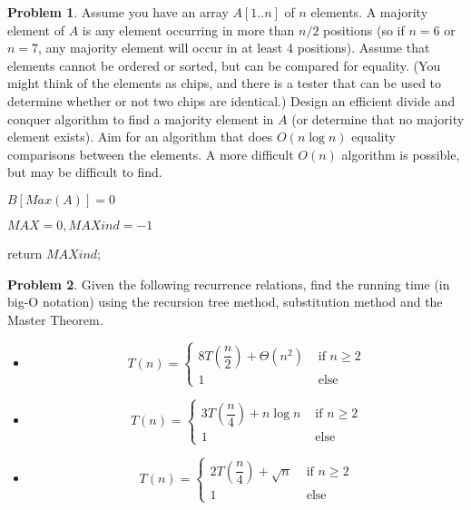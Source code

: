 \documentclass{article}
\theoremstyle{definition}
\newtheorem{Q}{Problem}
\begin{document}
\pagebreak
\begin{Q}
Assume you have an array $A[1..n]$ of $n$ elements. A majority element of $A$ is any element occurring in more than $n/2$ positions (so if $n = 6$ or $n = 7$, any majority element will occur in at least $4$ positions). Assume that elements cannot be ordered or sorted, but can be compared for equality. (You might think of the elements as chips, and there is a tester that can be used to determine whether or not two chips are identical.) Design an efficient divide and conquer algorithm to find a majority element in $A$ (or determine that no majority element exists). Aim for an algorithm that does $O(n \log n)$ equality comparisons between the elements. A more difficult $O(n)$ algorithm is possible, but may be difficult to find. 
\end{Q}


\begin{algorithm}
\caption{}\label{}
\begin{algorithmic}

  \State $B[Max(A)] =  {0}$
    \State{$B[A[i]++$}
    \EndFor
    
  \State $MAX = 0,MAXind=-1$
   
    \EndIf
    
    \EndFor
    \State return $MAXind$;


\EndProcedure
\end{algorithmic}
\end{algorithm}

\pagebreak


\begin{Q}
Given the following recurrence relations, find the running time (in big-O notation) using the recursion tree method, substitution method and the Master Theorem.
\begin{itemize}
\item $$T(n) = \begin{cases} 8T\left(\dfrac{n}{2}\right) + \Theta(n^2) & \text{ if } n\geq2 \\ 1 & \text{ else } \end{cases}$$
\item $$T(n) = \begin{cases} 3T\left(\dfrac{n}{4}\right) + n\log n & \text{ if } n\geq 2 \\ 1 & \text{ else } \end{cases}$$
\item $$T(n) = \begin{cases} 2T\left(\dfrac{n}{4}\right) + \sqrt{n} & \text{ if } n\geq 2 \\ 1 & \text{ else } \end{cases}$$
\end{itemize}

\end{Q}
\end{document}
